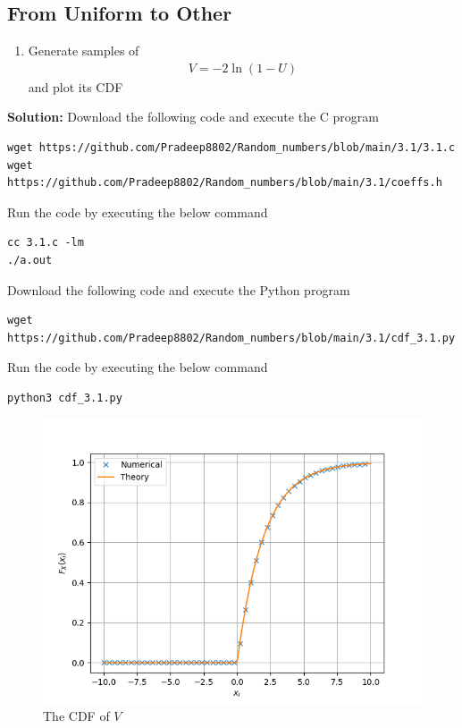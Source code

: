 \documentclass[journal,12pt,twocolumn]{IEEEtran}
\newcommand{\solution}{\noindent \textbf{Solution: }}
\providecommand{\brak}[1]{\ensuremath{\left(#1\right)}}
\numberwithin{equation}{section}
\renewcommand\thesection{\arabic{section}}
\begin{document}
\begin{enumerate}[label=\thesection.\arabic*,ref=\thesection.\theenumi]
	\section{From Uniform to Other}
	\begin{enumerate}[label=\thesection.\arabic*,ref=\thesection.\theenumi]
	\item Generate samples of 
	\begin{align}
		V = -2\ln\brak{1-U}
	\end{align}
	and plot its CDF
	\end{enumerate}
	\solution Download the following code and execute the C program
	\begin{lstlisting}
wget https://github.com/Pradeep8802/Random_numbers/blob/main/3.1/3.1.c
wget https://github.com/Pradeep8802/Random_numbers/blob/main/3.1/coeffs.h
	\end{lstlisting}
	Run the code by executing the below command
	\begin{lstlisting}
cc 3.1.c -lm
./a.out
	\end{lstlisting}
	Download the following code and execute the Python program
	\begin{lstlisting}
wget https://github.com/Pradeep8802/Random_numbers/blob/main/3.1/cdf_3.1.py
	\end{lstlisting}
	Run the code by executing the below command
	\begin{lstlisting}
python3 cdf_3.1.py
	\end{lstlisting}
	\begin{figure}
		\centering
		\includegraphics[width=\columnwidth]{../figs/cdf_3.1.png}
		\caption{The CDF of $V$}
		\label{fig-3.1}
	\end{figure}	
	

\end{enumerate}
\end{document}
